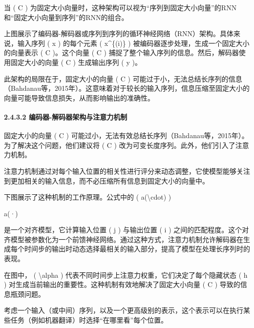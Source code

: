 当 ( C )
为固定大小向量时，这种架构可以视为``序列到固定大小向量''的RNN和``固定大小向量到序列''的RNN的组合。

上图展示了编码器-解码器或序列到序列的循环神经网络（RNN）架构。具体来说，输入序列
( x ) 的每个元素 ( x\^{}\{(i)\} )
被编码器逐步处理，生成一个固定大小的向量表示 ( C )。这个向量 ( C )
捕捉了整个输入序列的信息。然后，解码器使用固定大小的向量 ( C )
生成输出序列 ( y )。

此架构的局限在于，固定大小的向量 ( C )
可能过于小，无法总结长序列的信息（Bahdanau等，2015年）。这意味着对于较长的输入序列，信息压缩至固定大小的向量可能导致信息损失，从而影响输出的准确性。

\paragraph{\texorpdfstring{ }{ }}\label{-3}

\paragraph{\texorpdfstring{\textbf{2.4.3.2}
\textbf{编码器-解码器架构与注意力机制}}{2.4.3.2 编码器-解码器架构与注意力机制}}\label{2432-ux7f16ux7801ux5668-ux89e3ux7801ux5668ux67b6ux6784ux4e0eux6ce8ux610fux529bux673aux5236}

固定大小的向量 ( C )
可能过小，无法有效总结长序列（Bahdanau等，2015年）。为了解决这个问题，他们建议将
( C ) 改为可变长度序列。此外，他们引入了注意力机制。

注意力机制通过对每个输入位置的相关性进行评分来动态调整，它使模型能够关注到更加相关的输入信息，而不必压缩所有信息到固定大小的向量中。

下图展示了这种机制的工作原理。公式中的 ( a(\textbackslash cdot) )

a(·)

是一个对齐模型，它计算输入位置 ( j ) 与输出位置 ( i )
之间的匹配程度。这个对齐模型被参数化为一个前馈神经网络。通过这种方式，注意力机制允许解码器在生成每个时间步的输出时动态选择最相关的输入部分，提高了模型在处理长序列时的表现。


在图中， ( \textbackslash alpha )
代表不同时间步上注意力权重，它们决定了每个隐藏状态 ( h )
对生成当前输出的重要性。这种机制有效地解决了固定大小向量 ( C )
导致的信息瓶颈问题。

考虑一个输入（或中间）序列，以及一个更高级别的表示，这个表示可以在执行某些任务（例如机器翻译）时选择``在哪里看''每个位置。

